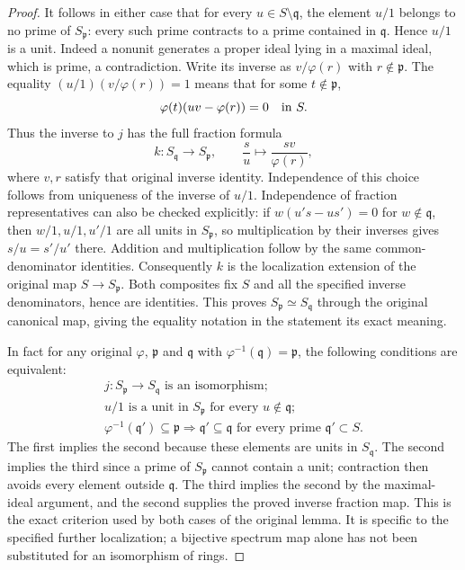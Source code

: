 \begin{proof}
It follows in either case that for every
$u\in S\setminus\mathfrak q$, the element $u/1$
belongs to no prime of $S_{\mathfrak p}$: every
such prime contracts to a prime contained in
$\mathfrak q$. Hence $u/1$ is a unit. Indeed a
nonunit generates a proper ideal lying in a
maximal ideal, which is prime, a contradiction.
Write its inverse as $v/\varphi(r)$ with
$r\notin\mathfrak p$. The equality
$(u/1)(v/\varphi(r))=1$ means that for some
$t\notin\mathfrak p$,
$$
\varphi(t)(uv-\varphi(r))=0\quad\hbox{in }S.
$$
Thus the inverse to $j$ has the full fraction
formula
$$
k:S_{\mathfrak q}\longrightarrow S_{\mathfrak p},
\qquad
\frac su\longmapsto\frac{sv}{\varphi(r)},
$$
where $v,r$ satisfy that original inverse identity.
Independence of this choice follows from uniqueness
of the inverse of $u/1$. Independence of fraction
representatives can also be checked explicitly:
if $w(u's-us')=0$ for $w\notin\mathfrak q$,
then $w/1,u/1,u'/1$ are all units in
$S_{\mathfrak p}$, so multiplication by their
inverses gives $s/u=s'/u'$ there. Addition and
multiplication follow by the same common-denominator
identities. Consequently $k$ is the localization
extension of the original map $S\to S_{\mathfrak p}$.
Both composites fix $S$ and all the specified inverse
denominators, hence are identities. This proves
$S_{\mathfrak p}\simeq S_{\mathfrak q}$ through
the original canonical map, giving the equality
notation in the statement its exact meaning.

In fact for any original $\varphi$, $\mathfrak p$
and $\mathfrak q$ with
$\varphi^{-1}(\mathfrak q)=\mathfrak p$, the
following conditions are equivalent:
$$
\begin{gathered}
j:S_{\mathfrak p}\longrightarrow S_{\mathfrak q}
\text{ is an isomorphism};\\
u/1\text{ is a unit in }S_{\mathfrak p}
\text{ for every }u\notin\mathfrak q;\\
\varphi^{-1}(\mathfrak q')\subseteq\mathfrak p
\Longrightarrow\mathfrak q'\subseteq\mathfrak q
\text{ for every prime }\mathfrak q'\subset S.
\end{gathered}
$$
The first implies the second because these elements
are units in $S_{\mathfrak q}$. The second implies
the third since a prime of $S_{\mathfrak p}$ cannot
contain a unit; contraction then avoids every
element outside $\mathfrak q$. The third implies
the second by the maximal-ideal argument, and the
second supplies the proved inverse fraction map.
This is the exact criterion used by both cases
of the original lemma. It is specific to the
specified further localization; a bijective
spectrum map alone has not been substituted for
an isomorphism of rings.
\end{proof}